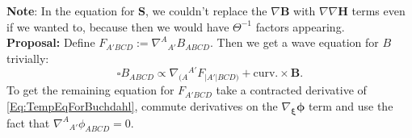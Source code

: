 \documentclass[10pt,a4paper]{article}
\theoremstyle{plain}
\def\bmB{{\bm B}}
\def\bmH{{\bm H}}
\def\bmS{{\bm S}}
\def\bmB{{\bm B}}
\def\bmH{{\bm H}}
\def\bmS{{\bm S}}
\begin{document}
\textbf{Note}: In the equation for $\bmS$, we couldn't replace the $\nabla \bmB$ with $\nabla\nabla\bmH$ terms even if we wanted to, because then we would have $\Theta^{-1}$ factors appearing. 
\\

\textbf{Proposal:} Define $F_{A'BCD}:=\nabla^A{}_{A'}B_{ABCD}$. Then we get a wave equation for $B$ trivially:
\[\square B_{ABCD} \propto \nabla_{(A}{}^{A'}F_{\vert A'\vert BCD)} + \text{curv.}\times \bmB. \]
To get the remaining equation for $F_{A'BCD}$ take a contracted derivative of \eqref{Eq:TempEqForBuchdahl}, commute derivatives on the $\nabla_{\bm\xi}\bm\phi$ term and use the fact that $\nabla^A{}_{A'}\phi_{ABCD}=0.$
\end{document}
